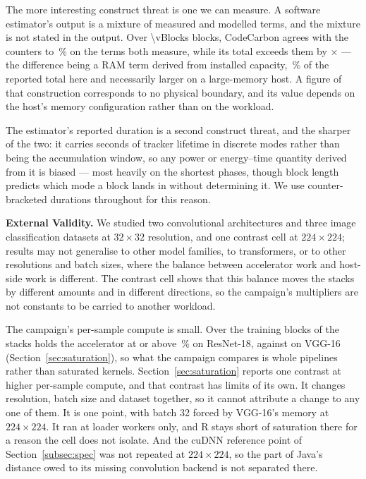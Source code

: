 The more interesting construct threat is one we can measure. A software
estimator's output is a mixture of measured and modelled terms, and the mixture
is not stated in the output. Over \num{\vBlocks} blocks, CodeCarbon agrees with the
counters to \vCCmeasDisagreementPct\,\% on the terms both measure, while its
total exceeds them by \vCCtotalRatio$\times$ --- the difference being a RAM term
derived from installed capacity, \vCCramSharePct\,\% of the reported total here
and necessarily larger on a large-memory host. A figure of that construction
corresponds to no physical boundary, and its value depends on the host's memory
configuration rather than on the workload.

The estimator's reported duration is a second construct threat, and the sharper
of the two: it carries seconds of tracker lifetime in \vWindowModes{} discrete
modes rather than being the accumulation window, so any power or energy--time
quantity derived from it is biased --- most heavily on the shortest phases,
though block length predicts which mode a block lands in without determining it.
We use counter-bracketed durations throughout for this reason.

\textbf{External Validity.}
We studied two convolutional architectures and three image classification
datasets at $32\times32$ resolution, and one contrast cell at $224\times224$;
results may not generalise to other model families, to transformers, or to
other resolutions and batch sizes, where the balance between accelerator work
and host-side work is different. The contrast cell shows that this balance
moves the stacks by different amounts and in different directions, so the
campaign's multipliers are not constants to be carried to another workload.

The campaign's per-sample compute is small. Over the training blocks
\vSatRefUtilResnetHighCount{} of the \vEcosystems{} stacks holds the accelerator
at or above \vSatRefUtilHighPct\,\% on ResNet-18, against
\vSatRefUtilVggHighCount{} on VGG-16 (Section~\ref{sec:saturation}), so what the campaign compares is whole pipelines
rather than saturated kernels. Section~\ref{sec:saturation} reports one contrast
at higher per-sample compute, and that contrast has limits of its own. It
changes resolution, batch size and dataset together, so it cannot attribute a
change to any one of them. It is one point, with batch 32 forced by VGG-16's
memory at $224\times224$. It ran at \vSatLoaderThreads{} loader workers only,
and R stays short of saturation there for a reason the cell does not isolate.
And the cuDNN reference point of Section~\ref{subsec:spec} was not repeated at
$224\times224$, so the part of Java's distance owed to its missing convolution
backend is not separated there.

